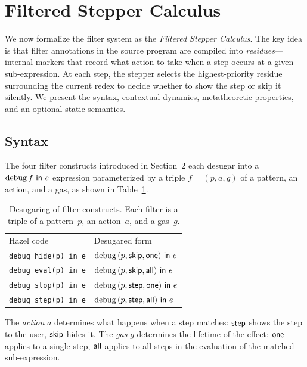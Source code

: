\section{Filtered Stepper Calculus}\label{sec:filter}

We now formalize the filter system as the \emph{Filtered Stepper
Calculus}. The key idea is that filter annotations in the source
program are compiled into \emph{residues}---internal markers that
record what action to take when a step occurs at a given
sub-expression. At each step, the stepper selects the
highest-priority residue surrounding the current redex to decide
whether to show the step or skip it silently. We present the syntax,
contextual dynamics, metatheoretic properties, and an optional static
semantics.

\subsection{Syntax}

The four filter constructs introduced in Section~2 each desugar into a
\(\operatorname{debug}{} f~\mathsf{in}~e\) expression parameterized by a triple \(f = (p, a, g)\)
of a pattern, an action, and a gas, as shown in
Table~\ref{tbl:filter-syntax-sugar}.

\begin{table}[htpb]
  \begin{tabular}{ll}
    Hazel code & Desugared form \\
    \verb|debug hide(p) in e| & \(\operatorname{debug}{} (p, \mathsf{skip}, \mathsf{one})~\mathsf{in}~e\) \\
    \verb|debug eval(p) in e| & \(\operatorname{debug}{} (p, \mathsf{skip}, \mathsf{all})~\mathsf{in}~e\) \\
    \verb|debug stop(p) in e| & \(\operatorname{debug}{} (p, \mathsf{step}, \mathsf{one})~\mathsf{in}~e\) \\
    \verb|debug step(p) in e| & \(\operatorname{debug}{} (p, \mathsf{step}, \mathsf{all})~\mathsf{in}~e\) \\
  \end{tabular}
  \caption{Desugaring of filter constructs. Each filter is a triple of
    a pattern~\(p\), an action~\(a\), and a gas~\(g\).}\label{tbl:filter-syntax-sugar}
\end{table}

The \emph{action} \(a\) determines what happens when a step matches:
\(\mathsf{step}\) shows the step to the user, \(\mathsf{skip}\) hides it. The
\emph{gas} \(g\) determines the lifetime of the effect: \(\mathsf{one}\)
applies to a single step, \(\mathsf{all}\) applies to all steps in the
evaluation of the matched sub-expression.


